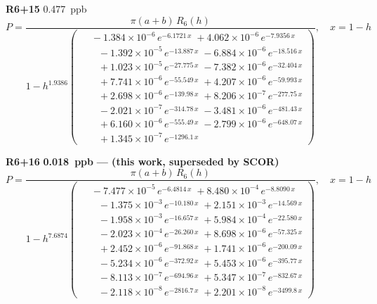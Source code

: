 \documentclass[12pt]{article}
\begin{document}
\noindent\textbf{R6+15} 0.477~ppb\nopagebreak
\begin{equation*}
P = \frac{\pi(a{+}b)\,R_6(h)}{1 - h^{1.9386}\!\left(\!\begin{aligned}
  &\; -1.384{\times}10^{-6}\,e^{-6.1721\,x} \; +4.062{\times}10^{-6}\,e^{-7.9356\,x} \\[-3pt]
  &\quad -1.392{\times}10^{-5}\,e^{-13.887\,x} \; -6.884{\times}10^{-6}\,e^{-18.516\,x} \\[-3pt]
  &\quad +1.023{\times}10^{-5}\,e^{-27.775\,x} \; -7.382{\times}10^{-6}\,e^{-32.404\,x} \\[-3pt]
  &\quad +7.741{\times}10^{-6}\,e^{-55.549\,x} \; +4.207{\times}10^{-6}\,e^{-59.993\,x} \\[-3pt]
  &\quad +2.698{\times}10^{-6}\,e^{-139.98\,x} \; +8.206{\times}10^{-7}\,e^{-277.75\,x} \\[-3pt]
  &\quad -2.021{\times}10^{-7}\,e^{-314.78\,x} \; -3.481{\times}10^{-6}\,e^{-481.43\,x} \\[-3pt]
  &\quad +6.160{\times}10^{-6}\,e^{-555.49\,x} \; -2.799{\times}10^{-6}\,e^{-648.07\,x} \\[-3pt]
  &\quad +1.345{\times}10^{-7}\,e^{-1296.1\,x}
\end{aligned}\!\right)}, \quad x = 1{-}h
\end{equation*}

\noindent\textbf{R6+16} \textbf{0.018~ppb} \textbf{--- (this work, superseded by SCOR)}\nopagebreak
\begin{equation*}
P = \frac{\pi(a{+}b)\,R_6(h)}{1 - h^{7.6874}\!\left(\!\begin{aligned}
  &\; -7.477{\times}10^{-5}\,e^{-6.4814\,x} \; +8.480{\times}10^{-4}\,e^{-8.8090\,x} \\[-3pt]
  &\quad -1.375{\times}10^{-3}\,e^{-10.180\,x} \; +2.151{\times}10^{-3}\,e^{-14.569\,x} \\[-3pt]
  &\quad -1.958{\times}10^{-3}\,e^{-16.657\,x} \; +5.984{\times}10^{-4}\,e^{-22.580\,x} \\[-3pt]
  &\quad -2.023{\times}10^{-4}\,e^{-26.260\,x} \; +8.698{\times}10^{-6}\,e^{-57.325\,x} \\[-3pt]
  &\quad +2.452{\times}10^{-6}\,e^{-91.868\,x} \; +1.741{\times}10^{-6}\,e^{-200.09\,x} \\[-3pt]
  &\quad -5.234{\times}10^{-6}\,e^{-372.92\,x} \; +5.453{\times}10^{-6}\,e^{-395.77\,x} \\[-3pt]
  &\quad -8.113{\times}10^{-7}\,e^{-694.96\,x} \; +5.347{\times}10^{-7}\,e^{-832.67\,x} \\[-3pt]
  &\quad -2.118{\times}10^{-8}\,e^{-2816.7\,x} \; +2.201{\times}10^{-8}\,e^{-3499.8\,x}
\end{aligned}\!\right)}, \quad x = 1{-}h
\end{equation*}
\end{document}
